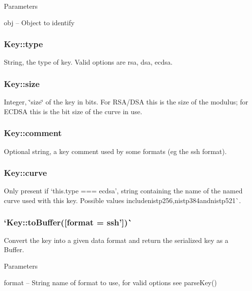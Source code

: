 Parameters


\begin{DoxyItemize}
\item {\ttfamily obj} -- Object to identify
\end{DoxyItemize}

\subsubsection*{{\ttfamily Key\+::type}}

String, the type of key. Valid options are {\ttfamily rsa}, {\ttfamily dsa}, {\ttfamily ecdsa}.

\subsubsection*{{\ttfamily Key\+::size}}

Integer, \char`\"{}size\char`\"{} of the key in bits. For R\+S\+A/\+D\+SA this is the size of the modulus; for E\+C\+D\+SA this is the bit size of the curve in use.

\subsubsection*{{\ttfamily Key\+::comment}}

Optional string, a key comment used by some formats (eg the {\ttfamily ssh} format).

\subsubsection*{{\ttfamily Key\+::curve}}

Only present if `this.\+type === \textquotesingle{}ecdsa'{\ttfamily , string containing the name of the named curve used with this key. Possible values include}nistp256{\ttfamily ,}nistp384{\ttfamily  and}nistp521\`{}.

\subsubsection*{`Key\+::to\+Buffer(\mbox{[}format = \textquotesingle{}ssh'\mbox{]})\`{}}

Convert the key into a given data format and return the serialized key as a Buffer.

Parameters


\begin{DoxyItemize}
\item {\ttfamily format} -- String name of format to use, for valid options see {\ttfamily parse\+Key()}
\end{DoxyItemize}

